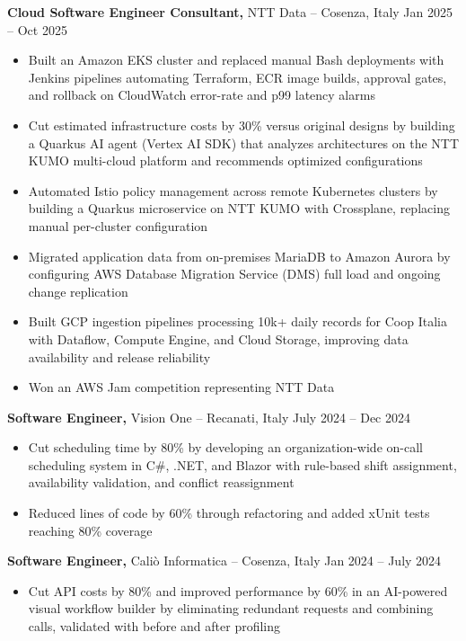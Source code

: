 \documentclass[11pt]{article}       %
\begin{document}
\textbf{Cloud Software Engineer Consultant,} {NTT Data} -- Cosenza, Italy \hfill Jan 2025 -- Oct 2025 \\
\vspace{-9pt}
\begin{itemize}
  \item Built an Amazon EKS cluster and replaced manual Bash deployments with Jenkins pipelines automating Terraform, ECR image builds, approval gates, and rollback on CloudWatch error-rate and p99 latency alarms
  \item Cut estimated infrastructure costs by 30\% versus original designs by building a Quarkus AI agent (Vertex AI SDK) that analyzes architectures on the NTT KUMO multi-cloud platform and recommends optimized configurations
  \item Automated Istio policy management across remote Kubernetes clusters by building a Quarkus microservice on NTT KUMO with Crossplane, replacing manual per-cluster configuration
  \item Migrated application data from on-premises MariaDB to Amazon Aurora by configuring AWS Database Migration Service (DMS) full load and ongoing change replication
  \item Built GCP ingestion pipelines processing 10k+ daily records for Coop Italia with Dataflow, Compute Engine, and Cloud Storage, improving data availability and release reliability
  \item Won an AWS Jam competition representing NTT Data
\end{itemize}

\textbf{Software Engineer,} {Vision One} -- Recanati, Italy \hfill July 2024 -- Dec 2024 \\
\vspace{-9pt}
\begin{itemize}
  \item Cut scheduling time by 80\% by developing an organization-wide on-call scheduling system in C\#, .NET, and Blazor with rule-based shift assignment, availability validation, and conflict reassignment
  \item Reduced lines of code by 60\% through refactoring and added xUnit tests reaching 80\% coverage
\end{itemize}

\textbf{Software Engineer,} {Caliò Informatica} -- Cosenza, Italy \hfill Jan 2024 -- July 2024 \\
\vspace{-9pt}
\begin{itemize}
  \item Cut API costs by 80\% and improved performance by 60\% in an AI-powered visual workflow builder by eliminating redundant requests and combining calls, validated with before and after profiling
\end{itemize}
\end{document}
